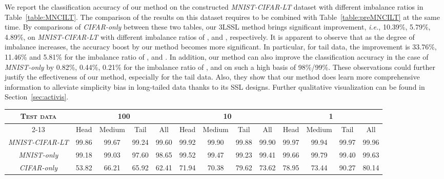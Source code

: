 \documentclass[10pt,journal,compsoc]{IEEEtran}
\newcommand{\ie}{\emph{i.e.}}
\begin{document}
We report the classification accuracy of our method on the constructed \emph{MNIST-CIFAR-LT} dataset with different imbalance ratios in Table~\ref{table:MNCILT}. The comparison of the results on this dataset requires to be combined with Table~\ref{table:preMNCILT} at the same time. By comparisons of \emph{CIFAR-only} between these two tables, our 3LSSL method brings significant improvement, \ie, 10.39\%, 5.79\%, 4.89\%, on \emph{MNIST-CIFAR-LT} with different imbalance ratios of ,  and , respectively. It is apparent to observe that as the degree of imbalance increases, the accuracy boost by our method becomes more significant. In particular, for tail data, the improvement is 33.76\%, 11.46\% and 5.81\% for the imbalance ratio of ,  and . In addition, our method can also improve the classification accuracy in the case of \emph{MNIST-only} by 0.82\%, 0.44\%, 0.21\% for the imbalance ratio of ,  and  on such a high basis of 98\%/99\%. These observations could further justify the effectiveness of our method, especially for the tail data. Also, they show that our method does learn more comprehensive information to alleviate simplicity bias in long-tailed data thanks to its SSL designs. Further qualitative visualization can be found in Section~\ref{sec:activis}.

\begin{table*}[t!]
\centering
\small
\renewcommand\arraystretch{1.1}
\caption{\small Classification accuracy (\%) of our proposed 3LSSL method on the constructed \emph{MNIST-CIFAR-LT} dataset with different imbalance ratios (\ie, 100, 10, and 1).}
\begin{tabular}{c|cccc|cccc|cccc}
\toprule
\multirow{2}{*}{\textsc{Test data}} & \multicolumn{4}{c|}{100}        & \multicolumn{4}{c|}{10}         & \multicolumn{4}{c}{1}          \\
\cline{2-13}
                           & \textsf{Head}  & \textsf{Medium} & \textsf{Tail}  & \textsf{All}   & \textsf{Head}  & \textsf{Medium} & \textsf{Tail}  & \textsf{All}   & \textsf{Head}  & \textsf{Medium} & \textsf{Tail}  & \textsf{All} \bigstrut[t]  \\
\hline
\emph{MNIST-CIFAR-LT}      & 99.86 & 99.67 & 99.24 & 99.60 & 99.92 & 99.90 & 99.88 & 99.90 & 99.97 & 99.94 & 99.97 & 99.96 \bigstrut[t]\\
\emph{MNIST-only}          & 99.18 & 99.03 & 97.60 & 98.65 & 99.52 & 99.47 & 99.23 & 99.41 & 99.66 & 99.79 & 99.40 & 99.63 \\
\emph{CIFAR-only}          & 53.82 & 66.21 & 65.92 & 62.41 & 71.94 & 70.38 & 79.62 & 73.62 & 78.95 & 73.44 & 90.27 & 80.14 \\
\bottomrule                
\end{tabular}
\label{table:MNCILT}
\end{table*}
\end{document}
